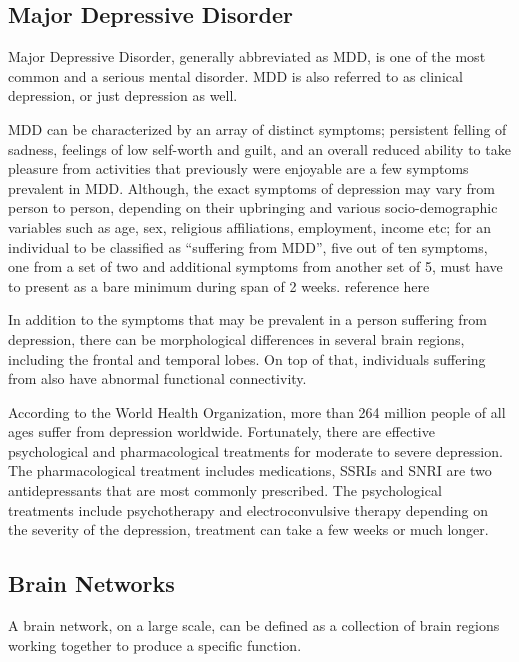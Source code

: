 \documentclass{article}
\begin{document}
\subsection{Major Depressive Disorder}

Major Depressive Disorder, generally abbreviated as MDD, is one of the
most common and a serious mental disorder. MDD is also referred to as
clinical depression, or just depression as well.

MDD can be characterized by an array of distinct symptoms; persistent
felling of sadness, feelings of low self-worth and guilt, and an
overall reduced ability to take pleasure from activities that
previously were enjoyable are a few symptoms prevalent in MDD.
Although, the exact symptoms of depression may vary from person to
person, depending on their upbringing and various socio-demographic
variables such as age, sex, religious affiliations, employment, income
etc; for an individual to be classified as ``suffering from MDD'',
five out of ten symptoms, one from a set of two and %
additional symptoms from another set of 5, must have to %
present as a bare minimum during span of 2 weeks.  %
reference here

In addition to the symptoms that may be prevalent in a person
suffering from depression, there can be morphological differences in
several brain regions, including the frontal and temporal lobes. On
top of that, individuals suffering from  also have abnormal functional
connectivity. %

According to the World Health Organization, more than 264 million
people of all ages suffer from depression worldwide. Fortunately,
there are effective psychological and pharmacological treatments for
moderate to severe depression. The pharmacological treatment includes
medications, SSRIs and SNRI are two antidepressants that are most
commonly prescribed. The psychological treatments include
psychotherapy and electroconvulsive therapy depending on the severity
of the depression, treatment can take a few weeks or much longer.

\subsection{Brain Networks}

A brain network, on a large scale, can be defined as a collection of
brain regions working together to produce a specific function.
\end{document}
